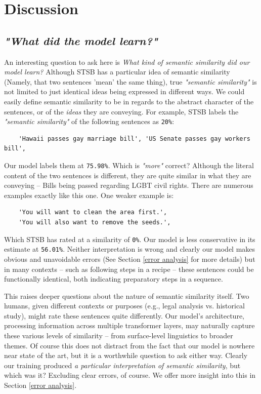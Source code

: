 \documentclass{article}
\begin{document}
\section{Discussion}

\subsection{\textit{"What did the model learn?"}}
An interesting question to ask here is \textit{What kind of semantic similarity did our model learn?} Although STSB has a particular idea of semantic similarity (Namely, that two sentences 'mean' the same thing), true \textit{"semantic similarity"} is not limited to just identical ideas being expressed in different ways. We could easily define semantic similarity to be in regards to the abstract character of the sentences, or of the \textit{ideas} they are conveying. For example, STSB labels the \textit{"semantic similarity"} of the following sentences as \verb|20%|:
\begin{verbatim}
    'Hawaii passes gay marriage bill', 'US Senate passes gay workers bill',
\end{verbatim}
Our model labels them at \verb|75.98%|. Which is \textit{"more"} correct? Although the literal content of the two sentences is different, they are quite similar in what they are conveying -- Bills being passed regarding LGBT civil rights. There are numerous examples exactly like this one. One weaker example is:
\begin{verbatim}
    'You will want to clean the area first.',
    'You will also want to remove the seeds.',
\end{verbatim}
Which STSB has rated at a similarity of \verb|0%|. Our model is less conservative in its estimate at \verb|56.01%|. Neither interpretation is wrong and clearly our model makes obvious and unavoidable errors (See Section \ref{error analysis} for more details) but in many contexts -- such as following steps in a recipe -- these sentences could be functionally identical, both indicating preparatory steps in a sequence.

This raises deeper questions about the nature of semantic similarity itself. Two humans, given different contexts or purposes (e.g., legal analysis vs. historical study), might rate these sentences quite differently. Our model's architecture, processing information across multiple transformer layers, may naturally capture these various levels of similarity -- from surface-level linguistics to broader themes. Of course this does not distract from the fact that our model is nowhere near state of the art, but it is a worthwhile question to ask either way. Clearly our training produced \textit{a particular interpretation of semantic similarity}, but which was it? Excluding clear errors, of course. We offer more insight into this in Section \ref{error analysis}.
\end{document}
